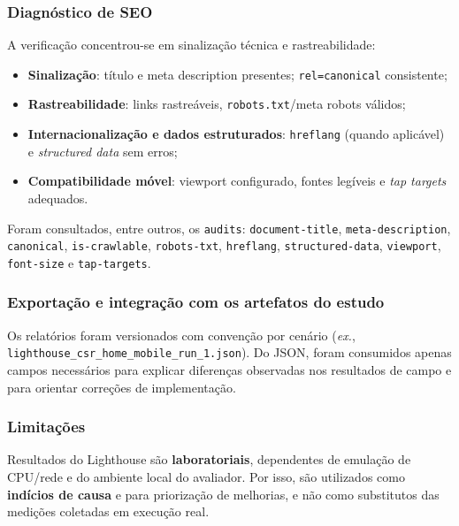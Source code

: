 \subsubsection{Diagnóstico de SEO}
A verificação concentrou-se em sinalização técnica e rastreabilidade:
\begin{itemize}
  \item \textbf{Sinalização}: título e meta description presentes; \texttt{rel=canonical} consistente;
  \item \textbf{Rastreabilidade}: links rastreáveis, \texttt{robots.txt}/meta robots válidos;
  \item \textbf{Internacionalização e dados estruturados}: \texttt{hreflang} (quando aplicável) e \textit{structured data} sem erros;
  \item \textbf{Compatibilidade móvel}: viewport configurado, fontes legíveis e \textit{tap targets} adequados.
\end{itemize}
Foram consultados, entre outros, os \texttt{audits}: \texttt{document-title}, \texttt{meta-description}, \texttt{canonical}, \texttt{is-crawlable}, \texttt{robots-txt}, \texttt{hreflang}, \texttt{structured-data}, \texttt{viewport}, \texttt{font-size} e \texttt{tap-targets}.

\subsubsection{Exportação e integração com os artefatos do estudo}
Os relatórios foram versionados com convenção por cenário (\textit{ex.}, \texttt{lighthouse\_csr\_home\_mobile\_run\_1.json}). Do JSON, foram consumidos apenas campos necessários para explicar diferenças observadas nos resultados de campo e para orientar correções de implementação.

\subsubsection{Limitações}
Resultados do Lighthouse são \textbf{laboratoriais}, dependentes de emulação de CPU/rede e do ambiente local do avaliador. Por isso, são utilizados como \textbf{indícios de causa} e para priorização de melhorias, e não como substitutos das medições coletadas em execução real.

